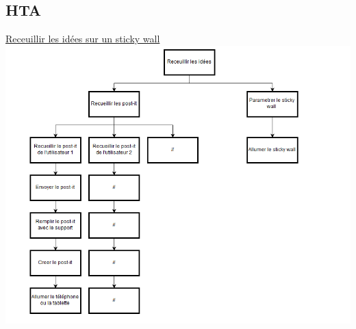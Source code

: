 \documentclass{article}
\begin{document}
\subsection{HTA}
\vspace{0.2cm}
\underline{Receuillir les idées sur un sticky wall}\\
\includegraphics[width=\textwidth]{5}\\
\vspace{0.2cm}
\end{document}
